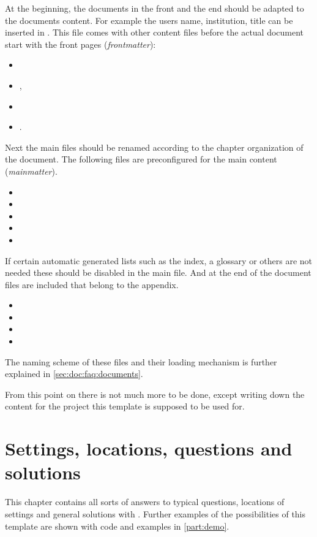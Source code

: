 At the beginning, the documents in the front and the end should be adapted to the documents content. For example the users name, institution, title can be inserted in . This file comes with other content files before the actual document start with the front pages (\emph{frontmatter}):
%
\begin{itemize}
\item {}
\item {},
\item {}
\item {}.
\end{itemize}
%

Next the main files should be renamed according to the chapter organization of the document. The following files are preconfigured for the main content (\emph{mainmatter}). 
%
\begin{itemize}
\item {}
\item {}
\item {}
\item {}
\item {}
\end{itemize}
%
If certain automatic generated lists such as the index, a glossary or others are not needed these should be disabled in the main file.
%
%
And at the end of the document files are included that belong to the appendix. %
\begin{itemize}
\item {}
\item {}
\item {}
\item {}
\end{itemize}
%
The naming scheme of these files and their loading mechanism is further explained in \cref{sec:doc:faq:documents}.

From this point on there is not much more to be done, except writing down the content for the project this template is supposed to be used for.



\chapter{Settings, locations, questions and solutions}
\label{chap:doc:faq}
This chapter contains all sorts of answers to typical questions, locations of settings and general solutions with \latex. Further examples of the possibilities of this template are shown with code and examples in \cref{part:demo}.

